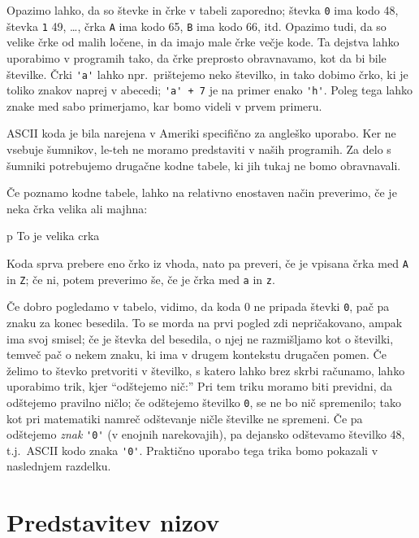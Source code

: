 \documentclass{book}
\begin{document}
Opazimo lahko, da so števke in črke v tabeli zaporedno; števka \verb+0+ ima kodo
48, števka \verb+1+ 49, \ldots, črka \verb+A+ ima kodo 65, \verb+B+ ima kodo 66,
itd.
Opazimo tudi, da so velike črke od malih ločene, in da imajo male črke večje
kode.
Ta dejstva lahko uporabimo v programih tako, da črke preprosto obravnavamo, kot
da bi bile številke.
Črki \verb+'a'+ lahko npr.~prištejemo neko številko, in tako dobimo črko, ki je
toliko znakov naprej v abecedi; \verb|'a' + 7| je na primer enako \verb|'h'|.
Poleg tega lahko znake med sabo primerjamo, kar bomo videli v prvem primeru.

\begin{errors}
  ASCII koda je bila narejena v Ameriki specifično za angleško uporabo.
  Ker ne vsebuje šumnikov, le-teh ne moramo predstaviti v naših programih.
  Za delo s šumniki potrebujemo drugačne kodne tabele, ki jih tukaj ne bomo
  obravnavali.
\end{errors}

\begin{examples}
  Če poznamo kodne tabele, lahko na relativno enostaven način preverimo, če je
  neka črka velika ali majhna:
  \begin{inout}
	p
	\tcblower
	To je velika crka
  \end{inout}
  Koda sprva prebere eno črko iz vhoda, nato pa preveri, če je vpisana črka med
  \verb+A+ in \verb+Z+; če ni, potem preverimo še, če je črka med \verb+a+ in
  \verb+z+.
\end{examples}

Če dobro pogledamo v tabelo, vidimo, da koda 0 ne pripada števki \verb+0+, pač
pa znaku za konec besedila.
To se morda na prvi pogled zdi nepričakovano, ampak ima svoj smisel; če je
števka del besedila, o njej ne razmišljamo kot o številki, temveč pač o nekem
znaku, ki ima v drugem kontekstu drugačen pomen.
Če želimo to števko pretvoriti v številko, s katero lahko brez skrbi računamo,
lahko uporabimo trik, kjer ``odštejemo nič:''
Pri tem triku moramo biti previdni, da odštejemo pravilno ničlo; če odštejemo
številko \verb+0+, se ne bo nič spremenilo; tako kot pri matematiki namreč
odštevanje ničle številke ne spremeni.
Če pa odštejemo \emph{znak} \verb+'0'+ (v enojnih narekovajih), pa dejansko
odštevamo številko 48, t.j.~ASCII kodo znaka \verb+'0'+.
Praktično uporabo tega trika bomo pokazali v naslednjem razdelku.

\section{Predstavitev nizov}
\end{document}
